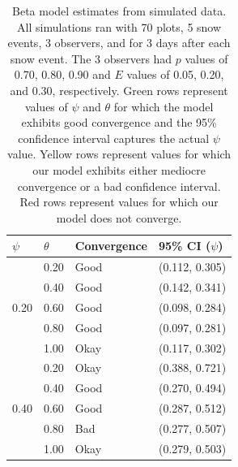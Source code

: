 \documentclass[12pt]{article}
\begin{document}
    \begin{table}
    \caption{Beta model estimates from simulated data. All simulations
    ran with 70 plots, 5 snow events, 3 observers, and for 3 days after each
    snow event. The 3 observers had \(p\) values of 0.70, 0.80, 0.90 and \(E\)
    values of 0.05, 0.20, and 0.30, respectively. Green rows represent values of
    \(\psi\) and \(\theta\) for which the model exhibits good convergence and
    the 95\% confidence interval captures the actual \(\psi\) value.  Yellow
    rows represent values for which our model exhibits either mediocre
    convergence or a bad confidence interval.  Red rows represent values for
    which our model does not converge.}
    \label{Simulated data}
    \begin{center}
    \begin{tabular}{|l|l|l|l|}
        \hline
            \(\psi\) & \(\theta\) & Convergence & 95\% CI (\(\psi\)) \\
        \hline
        \multirow{5}{*}{0.20}
            & \cellcolor{Green}0.20 & \cellcolor{Green}Good &
              \cellcolor{Green}(0.112, 0.305) \\
            & \cellcolor{Green}0.40 & \cellcolor{Green}Good &
              \cellcolor{Green}(0.142, 0.341) \\
            & \cellcolor{Green}0.60 & \cellcolor{Green}Good &
              \cellcolor{Green}(0.098, 0.284) \\
            & \cellcolor{Green}0.80 & \cellcolor{Green}Good &
              \cellcolor{Green}(0.097, 0.281) \\
            & \cellcolor{Yellow}1.00 & \cellcolor{Yellow}Okay &
              \cellcolor{Yellow}(0.117, 0.302) \\
        \hline
        \multirow{5}{*}{0.40}
            & \cellcolor{Yellow}0.20 & \cellcolor{Yellow}Okay &
              \cellcolor{Yellow}(0.388, 0.721) \\
            & \cellcolor{Green}0.40 & \cellcolor{Green}Good &
              \cellcolor{Green}(0.270, 0.494) \\
            & \cellcolor{Green}0.60 & \cellcolor{Green}Good &
              \cellcolor{Green}(0.287, 0.512) \\
            & \cellcolor{Red}0.80 & \cellcolor{Red}Bad &
              \cellcolor{Red}(0.277, 0.507) \\
            & \cellcolor{Yellow}1.00 & \cellcolor{Yellow}Okay &
              \cellcolor{Yellow}(0.279, 0.503) \\
        \hline

\end{tabular}
\end{center}
\end{table}
\end{document}

